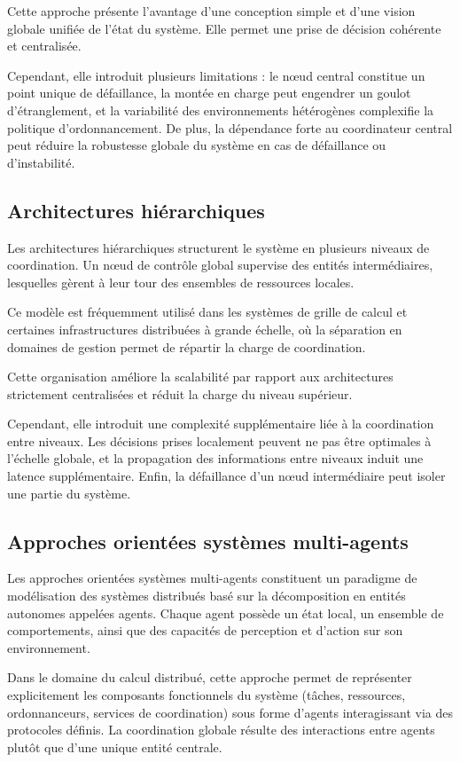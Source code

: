 \documentclass[12pt,a4paper]{report}
\begin{document}
Cette approche présente l'avantage d'une conception simple et d'une vision globale unifiée de l'état du système. Elle permet une prise de décision cohérente et centralisée.

Cependant, elle introduit plusieurs limitations : le nœud central constitue un point unique de défaillance, la montée en charge peut engendrer un goulot d'étranglement, et la variabilité des environnements hétérogènes complexifie la politique d'ordonnancement. De plus, la dépendance forte au coordinateur central peut réduire la robustesse globale du système en cas de défaillance ou d'instabilité.

\subsection{Architectures hiérarchiques}

Les architectures hiérarchiques structurent le système en plusieurs niveaux de coordination. Un nœud de contrôle global supervise des entités intermédiaires, lesquelles gèrent à leur tour des ensembles de ressources locales.

Ce modèle est fréquemment utilisé dans les systèmes de grille de calcul et certaines infrastructures distribuées à grande échelle, où la séparation en domaines de gestion permet de répartir la charge de coordination.

Cette organisation améliore la scalabilité par rapport aux architectures strictement centralisées et réduit la charge du niveau supérieur.

Cependant, elle introduit une complexité supplémentaire liée à la coordination entre niveaux. Les décisions prises localement peuvent ne pas être optimales à l'échelle globale, et la propagation des informations entre niveaux induit une latence supplémentaire. Enfin, la défaillance d'un nœud intermédiaire peut isoler une partie du système.

\subsection{Approches orientées systèmes multi-agents}

Les approches orientées systèmes multi-agents constituent un paradigme de modélisation des systèmes distribués basé sur la décomposition en entités autonomes appelées agents. Chaque agent possède un état local, un ensemble de comportements, ainsi que des capacités de perception et d'action sur son environnement.

Dans le domaine du calcul distribué, cette approche permet de représenter explicitement les composants fonctionnels du système (tâches, ressources, ordonnanceurs, services de coordination) sous forme d'agents interagissant via des protocoles définis. La coordination globale résulte des interactions entre agents plutôt que d'une unique entité centrale.
\end{document}
